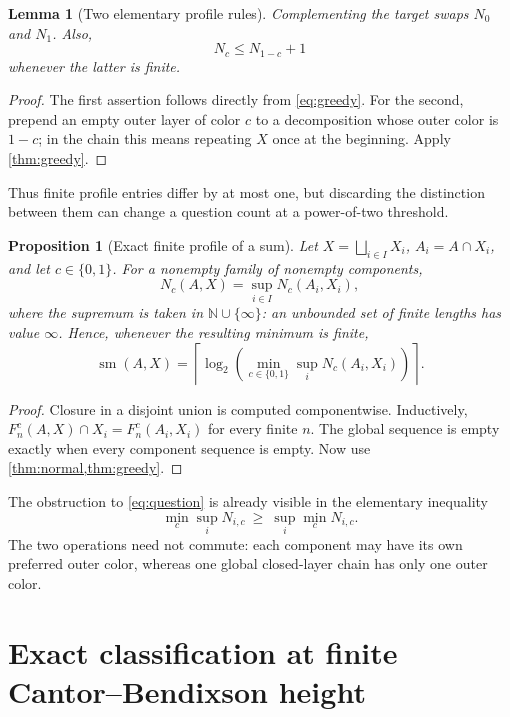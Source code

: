 \documentclass[11pt,letterpaper]{article}
\numberwithin{equation}{section}
\newtheorem{proposition}[proposition]{Proposition}
\newtheorem{lemma}[lemma]{Lemma}
\theoremstyle{definition}
\theoremstyle{remark}
\newcommand{\sm}{\operatorname{sm}}
\newcommand{\ceil}[1]{\left\lceil#1\right\rceil}
\newcommand{\N}{\mathbb N}
\newcommand{\bigsqsum}{\bigsqcup}
\begin{document}
\begin{lemma}[Two elementary profile rules]\label{lem:profiles}
Complementing the target swaps $N_0$ and $N_1$. Also,
\[
 N_c\leq N_{1-c}+1
\]
whenever the latter is finite.
\end{lemma}
\begin{proof}
The first assertion follows directly from \eqref{eq:greedy}. For the second,
prepend an empty outer layer of color $c$ to a decomposition whose outer color
is $1-c$; in the chain this means repeating $X$ once at the beginning.
Apply \cref{thm:greedy}.
\end{proof}

Thus finite profile entries differ by at most one, but discarding the distinction
between them can change a question count at a power-of-two threshold.

\begin{proposition}[Exact finite profile of a sum]\label{prop:profile-sum}
Let $X=\bigsqsum_{i\in I}X_i$, $A_i=A\cap X_i$, and let $c\in\{0,1\}$.
For a nonempty family of nonempty components,
\begin{equation}\label{eq:profile-sum}
 N_c(A,X)=\sup_{i\in I}N_c(A_i,X_i),
\end{equation}
where the supremum is taken in $\N\cup\{\infty\}$: an unbounded set of finite
lengths has value $\infty$. Hence, whenever the resulting minimum is finite,
\begin{equation}\label{eq:sumexact}
 \sm(A,X)=\ceil{\log_2\!\left(
   \min_{c\in\{0,1\}}\sup_i N_c(A_i,X_i)\right)}.
\end{equation}
\end{proposition}
\begin{proof}
Closure in a disjoint union is computed componentwise. Inductively,
$F^c_n(A,X)\cap X_i=F^c_n(A_i,X_i)$ for every finite $n$. The global sequence
is empty exactly when every component sequence is empty. Now use
\cref{thm:normal,thm:greedy}.
\end{proof}

The obstruction to \eqref{eq:question} is already visible in the elementary
inequality
\[
 \min_c\sup_i N_{i,c}\ \geq\ \sup_i\min_c N_{i,c}.
\]
The two operations need not commute: each component may have its own preferred
outer color, whereas one global closed-layer chain has only one outer color.

\section{Exact classification at finite Cantor--Bendixson height}
\label{sec:height}
\end{document}
